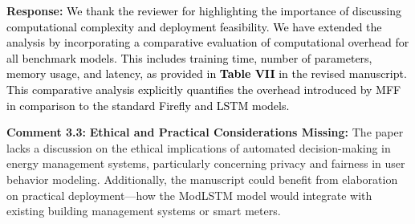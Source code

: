 \documentclass[12pt]{article}
\begin{document}
\hspace{-1.5em}\textbf{Response:}
\noindent\textcolor{black}{We thank the reviewer for highlighting the importance of discussing computational complexity and deployment feasibility. We have extended the analysis by incorporating a comparative evaluation of computational overhead for all benchmark models.
This includes training time, number of parameters, memory usage, and latency, as provided in \textbf{Table VII} in the revised manuscript. This comparative analysis explicitly quantifies the overhead introduced by MFF in comparison to the standard Firefly and LSTM models.}\newline
\newline


\noindent\textbf{Comment 3.3:} \textbf{Ethical and Practical Considerations Missing:} The paper lacks a discussion on the ethical implications of automated decision-making in energy management systems, particularly concerning privacy and fairness in user behavior modeling. Additionally, the manuscript could benefit from elaboration on practical deployment—how the ModLSTM model would integrate with existing building management systems or smart meters. 
\vspace{0.15cm}
\end{document}
